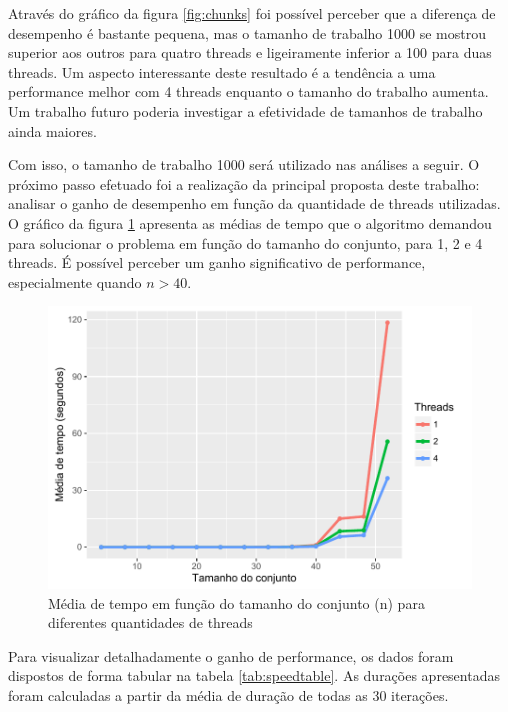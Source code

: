 \documentclass[12pt]{article}
\begin{document}
Através do gráfico da figura \ref{fig:chunks} foi possível perceber que a diferença de desempenho é bastante pequena, mas o tamanho de trabalho 1000 se mostrou superior aos outros para quatro threads e ligeiramente inferior a 100 para duas threads. Um aspecto interessante deste resultado é a tendência a uma performance melhor com 4 threads enquanto o tamanho do trabalho aumenta. Um trabalho futuro poderia investigar a efetividade de tamanhos de trabalho ainda maiores.

Com isso, o tamanho de trabalho 1000 será utilizado nas análises a seguir. O próximo passo efetuado foi a realização da principal proposta deste trabalho: analisar o ganho de desempenho em função da quantidade de threads utilizadas. O gráfico da figura \ref{fig:performance} apresenta as médias de tempo que o algoritmo demandou para solucionar o problema em função do tamanho do conjunto, para 1, 2 e 4 threads. É possível perceber um ganho significativo de performance, especialmente quando $n > 40$.

\begin{figure}[ht]
    \centering
    \includegraphics[width=12cm]{performance}
    \caption{Média de tempo em função do tamanho do conjunto (n) para diferentes quantidades de threads}
    \label{fig:performance}
\end{figure}

Para visualizar detalhadamente o ganho de performance, os dados foram dispostos de forma tabular na tabela \ref{tab:speedtable}. As durações apresentadas foram calculadas a partir da média de duração de todas as 30 iterações.
\end{document}
